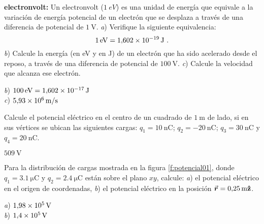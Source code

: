 %
\begin{Exercise}
  \textbf{electronvolt:} Un electronvolt ($\SI{1}{eV}$) es una unidad de energía que equivale a la variación de energía potencial de un electrón que se desplaza a través de una diferencia de potencial de $\SI{1}{\volt}$. \textit{a}) Verifique la siguiente equivalencia: \[\SI{1}{eV} = \SI{1.602E-19}{\joule}~.\] \textit{b}) Calcule la energía (en eV y en J) de un electrón que ha sido acelerado desde el reposo, a través de una diferencia de potencial de $\SI{100}{\volt}$. \textit{c}) Calcule la velocidad que alcanza ese electrón.
\end{Exercise}
\begin{Answer}
	\begin{minipage}[t]{.4\textwidth}
    \textit{b}) $\SI{100}{eV} = \SI{1.602E-17}{\joule}$\\ \textit{c}) $\SI{5.93E6}{\metre/\second}$
  \end{minipage}
\end{Answer}
%
\begin{Exercise}
  Calcule el potencial eléctrico en el centro de un cuadrado de $\SI{1}{\metre}$ de lado, si en sus vértices se ubican las siguientes cargas: $q_1 = \SI{10}{\nano\coulomb}$; $q_2 = \SI{-20}{\nano\coulomb}$; $q_3 = \SI{30}{\nano\coulomb}$ y $q_4 = \SI{20}{\nano\coulomb}$.
\end{Exercise}
\begin{Answer}
  $\SI{509}{\volt}$
\end{Answer}
%
\begin{Exercise}\label{p:potencial01}
  Para la distribución de cargas mostrada en la figura \ref{f:potencial01}, donde $q_1 = \SI{3.1}{\micro\coulomb}$ y $q_2 = \SI{2.4}{\micro\coulomb}$ están sobre el plano $xy$, calcule: \textit{a}) el potencial eléctrico en el origen de coordenadas, \textit{b}) el potencial eléctrico en la posición $\va*{r} =\SI{0.25}{\metre}\vu{z}$.
\end{Exercise}
\begin{Answer}
	\begin{minipage}[t]{.4\textwidth}
    \textit{a}) $\SI{1.98E5}{\volt}$\\ \textit{b}) $\SI{1.4E5}{\volt}$
  \end{minipage}
\end{Answer}
%
\begin{center}
\end{center}
